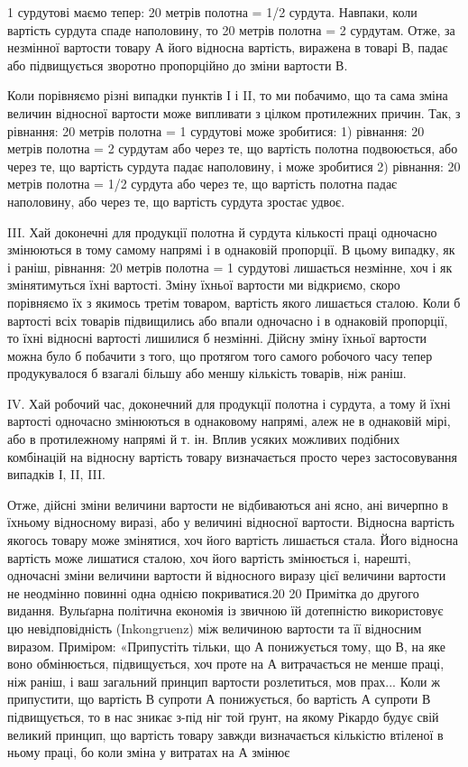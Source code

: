 \parcont{}  %
1 сурдутові маємо тепер: 20 метрів полотна = 1/2 сурдута. Навпаки,
коли вартість сурдута спаде наполовину, то 20 метрів полотна
= 2 сурдутам. Отже, за незмінної вартости товару А його
відносна вартість, виражена в товарі В, падає або підвищується
зворотно пропорційно до зміни вартости В.

Коли порівняємо різні випадки пунктів І і II, то ми побачимо,
що та сама зміна величин відносної вартости може випливати з
цілком протилежних причин. Так, з рівнання: 20 метрів полотна
= 1 сурдутові може зробитися: 1) рівнання: 20 метрів
полотна = 2 сурдутам або через те, що вартість полотна подвоюється,
або через те, що вартість сурдута падає наполовину, і
може зробитися 2) рівнання: 20 метрів полотна = 1/2 сурдута
або через те, що вартість полотна падає наполовину, або через те,
що вартість сурдута зростає удвоє.

III. Хай доконечні для продукції полотна й сурдута кількості
праці одночасно змінюються в тому самому напрямі і в однаковій
пропорції. В цьому випадку, як і раніш, рівнання: 20 метрів
полотна = 1 сурдутові лишається незмінне, хоч і як змінятимуться
їхні вартості. Зміну їхньої вартости ми відкриємо, скоро
порівняємо їх з якимось третім товаром, вартість якого лишається
сталою. Коли б вартості всіх товарів підвищились або впали
одночасно і в однаковій пропорції, то їхні відносні вартості лишилися
б незмінні. Дійсну зміну їхньої вартости можна було б
побачити з того, що протягом того самого робочого часу тепер
продукувалося б взагалі більшу або меншу кількість товарів,
ніж раніш.

IV. Хай робочий час, доконечний для продукції полотна і
сурдута, а тому й їхні вартості одночасно змінюються в однаковому
напрямі, алеж не в однаковій мірі, або в протилежному
напрямі й т. ін. Вплив усяких можливих подібних комбінацій
на відносну вартість товару визначається просто через застосовування
випадків І, II, III.

Отже, дійсні зміни величини вартости не відбиваються ані
ясно, ані вичерпно в їхньому відносному виразі, або у величині
відносної вартости. Відносна вартість якогось товару може змінятися,
хоч його вартість лишається стала. Його відносна вартість
може лишатися сталою, хоч його вартість змінюється і, нарешті,
одночасні зміни величини вартости й відносного виразу
цієї величини вартости не неодмінно повинні одна однією покриватися.20
20 Примітка до другого видання. Вульґарна політична економія
із звичною їй дотепністю використовує цю невідповідність (Inkongruenz)
між величиною вартости та її відносним виразом. Приміром: «Припустіть
тільки, що А понижується тому, що В, на яке воно обмінюється, підвищується,
хоч проте на А витрачається не менше праці, ніж раніш, і
ваш загальний принцип вартости розлетиться, мов прах... Коли ж припустити,
що вартість В супроти А понижується, бо вартість А супроти В
підвищується, то в нас зникає з-під ніг той ґрунт, на якому Рікардо
будує свій великий принцип, що вартість товару завжди визначається
кількістю втіленої в ньому праці, бо коли зміна у витратах на А змінює

